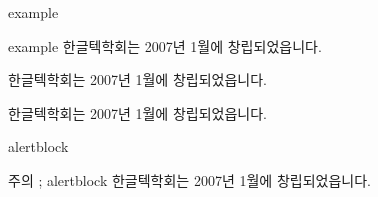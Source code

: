 \documentclass[10pt,blue,xcolor=pdftex,dvipsnames,table,handout]{beamer}
\begin{document}
		\begin{frame}[t]{example}

			\begin{example} {example}
			한글텍학회는 2007년 1월에 창립되었읍니다.	
			\end{example}

			\begin{example} {}
			한글텍학회는 2007년 1월에 창립되었읍니다.	
			\end{example}

			\begin{example}
			한글텍학회는 2007년 1월에 창립되었읍니다.	
			\end{example}


		\end{frame}


		\begin{frame}[t]{alertblock}

			\begin{alertblock} {주의 ; alertblock}
			한글텍학회는 2007년 1월에 창립되었읍니다.	
			\end{alertblock}

		\end{frame}
\end{document}

